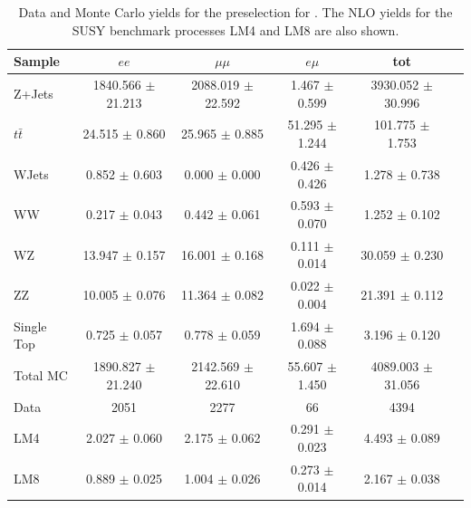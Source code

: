 \begin{table}[htb]
\begin{center}
\caption{\label{preselyieldtable} Data and Monte Carlo yields for the preselection for \lumi. 
  The NLO yields for the SUSY benchmark processes LM4 and LM8 are also shown.}
\begin{tabular}{lccccc}
\hline
              Sample   &                $ee$   &            $\mu\mu$   &              $e\mu$   &                 tot  \\
\hline
       Z+Jets & 1840.566 $\pm$ 21.213  &  2088.019 $\pm$ 22.592  &   1.467 $\pm$  0.599  &  3930.052 $\pm$ 30.996 \\ 
   $t\bar{t}$ & 24.515 $\pm$  0.860  &  25.965 $\pm$  0.885  &  51.295 $\pm$  1.244  &  101.775 $\pm$  1.753 \\ 
        WJets &  0.852 $\pm$  0.603  &   0.000 $\pm$  0.000  &   0.426 $\pm$  0.426  &   1.278 $\pm$  0.738 \\ 
           WW &  0.217 $\pm$  0.043  &   0.442 $\pm$  0.061  &   0.593 $\pm$  0.070  &   1.252 $\pm$  0.102 \\ 
           WZ & 13.947 $\pm$  0.157  &  16.001 $\pm$  0.168  &   0.111 $\pm$  0.014  &  30.059 $\pm$  0.230 \\ 
           ZZ & 10.005 $\pm$  0.076  &  11.364 $\pm$  0.082  &   0.022 $\pm$  0.004  &  21.391 $\pm$  0.112 \\ 
   Single Top &  0.725 $\pm$  0.057  &   0.778 $\pm$  0.059  &   1.694 $\pm$  0.088  &   3.196 $\pm$  0.120 \\ 
\hline
     Total MC & 1890.827 $\pm$ 21.240  &  2142.569 $\pm$ 22.610  &  55.607 $\pm$  1.450  &  4089.003 $\pm$ 31.056 \\ 
\hline
         Data &   2051                 &    2277                 &      66               &    4394 \\ 
\hline
          LM4 &  2.027 $\pm$  0.060  &   2.175 $\pm$  0.062  &   0.291 $\pm$  0.023  &   4.493 $\pm$  0.089 \\ 
          LM8 &  0.889 $\pm$  0.025  &   1.004 $\pm$  0.026  &   0.273 $\pm$  0.014  &   2.167 $\pm$  0.038 \\ 

\hline
\end{tabular}
\end{center}
\end{table}




